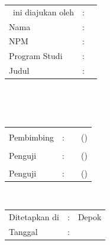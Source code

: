 %
%
%

\vspace*{0.4cm}
\noindent 

\noindent
\begin{tabular}{ll p{9cm}}
	\type~ini diajukan oleh&: & \\
	Nama&: & \penulis \\
	NPM&: & \npm \\
	Program Studi&: & \program \\
	Judul \type&: & \judul \\
\end{tabular} \\

\vspace*{1.0cm}

\noindent {}\\[0.2cm]

\begin{center}
\end{center}

\vspace*{0.3cm}

\begin{tabular}{l l l l }
	& & & \\
	Pembimbing&: & \pembimbing & (\hspace*{3.0cm}) \\
	& & & \\
	Penguji&: & \pengujisatu & (\hspace*{3.0cm}) \\
	& & & \\
	Penguji&: & \pengujidua & (\hspace*{3.0cm}) \\
	
\end{tabular}\\

\vspace*{2.0cm}

\begin{tabular}{ll l}
	Ditetapkan di&: & Depok\\
	Tanggal&: & \tanggalLulus \\
\end{tabular}


\newpage
